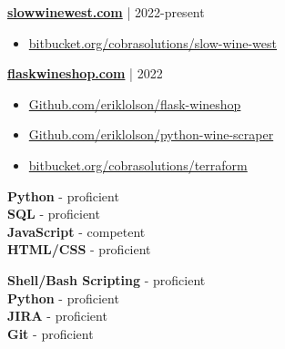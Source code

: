 \documentclass[9pt]{developercv} %
\begin{document}
\begin{minipage}[t]{0.45\textwidth}
	{\href{https://slowwinewest.com}{\bfseries slowwinewest.com}} | {2022-present}
		\begin{itemize}
   			\item {\href{https://bitbucket.org/cobrasolutions/slow-wine-west}{bitbucket.org/cobrasolutions/slow-wine-west}}
		\end{itemize}
\end{minipage}%
\hfill
\begin{minipage}[t]{0.45\textwidth}
		{\href{https://flaskwineshop.com}{\bfseries flaskwineshop.com}} | {2022}
            \begin{itemize}
                \item {\href{https://Github.com/eriklolson/flask-wineshop}{Github.com/eriklolson/flask-wineshop}}
                \item {\href{https://Github.com/eriklolson/python-wine-scraper}{Github.com/eriklolson/python-wine-scraper}}
                \item {\href{https://bitbucket.org/cobrasolutions/terraform}{bitbucket.org/cobrasolutions/terraform}}
            \end{itemize}
            
\end{minipage}%
	\vspace{44pt}
\begin{minipage}[t]{0.3\textwidth}
	\vspace{-\baselineskip} %

	\textbf{Python} - proficient\\
	\textbf{SQL} - proficient\\
	\textbf{JavaScript} - competent\\
	\textbf{HTML/CSS} - proficient\\
\end{minipage}
\hfill
\begin{minipage}[t]{0.3\textwidth}
	\vspace{-\baselineskip} %
	
	\textbf{Shell/Bash Scripting} - proficient\\
	\textbf{Python} - proficient\\
	\textbf{JIRA} - proficient\\
	\textbf{Git} - proficient\\
\end{minipage}
\end{document}
